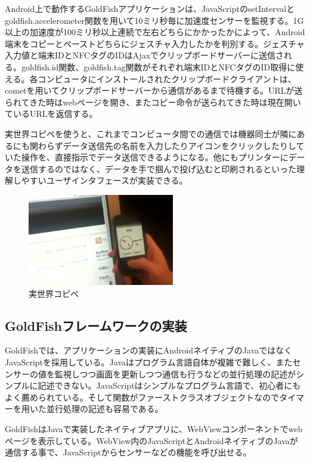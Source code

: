 Android上で動作するGoldFishアプリケーションは、JavaScriptのsetIntervalとgoldfish.accelerometer関数を用いて10ミリ秒毎に加速度センサーを監視する。1G以上の加速度が100ミリ秒以上連続で左右どちらにかかったかによって、Android端末をコピーとペーストどちらにジェスチャ入力したかを判別する。ジェスチャ入力値と端末IDとNFCタグのIDはAjaxでクリップボードサーバーに送信される。goldfish.id関数、goldfish.tag関数がそれぞれ端末IDとNFCタグのID取得に使える。各コンピュータにインストールされたクリップボードクライアントは、cometを用いてクリップボードサーバーから通信があるまで待機する。URLが送られてきた時はwebページを開き、またコピー命令が送られてきた時は現在開いているURLを返信する。

実世界コピペを使うと、これまでコンピュータ間での通信では機器同士が隣にあるにも関わらずデータ送信先の名前を入力したりアイコンをクリックしたりしていた操作を、直接指示でデータ送信できるようになる。他にもプリンターにデータを送信するのではなく、データを手で掴んで投げ込むと印刷されるといった理解しやすいユーザインタフェースが実装できる。

\begin{figure}
  \begin{center}
    \includegraphics[height=40mm]{img/copy-paste.jpg}
  \end{center}
  \caption{実世界コピペ}
  \label{fig:copy-paste}
\end{figure}


\subsection{GoldFishフレームワークの実装}
GoldFishでは、アプリケーションの実装にAndroidネイティブのJavaではなくJavaScriptを採用している。Javaはプログラム言語自体が複雑で難しく、またセンサーの値を監視しつつ画面を更新しつつ通信も行うなどの並行処理の記述がシンプルに記述できない。JavaScriptはシンプルなプログラム言語で、初心者にもよく薦められている。そして関数がファーストクラスオブジェクトなのでタイマーを用いた並行処理の記述も容易である。

GoldFishはJavaで実装したネイティブアプリに、WebViewコンポーネントでwebページを表示している。WebView内のJavaScriptとAndroidネイティブのJavaが通信する事で、JavaScriptからセンサーなどの機能を呼び出せる。

